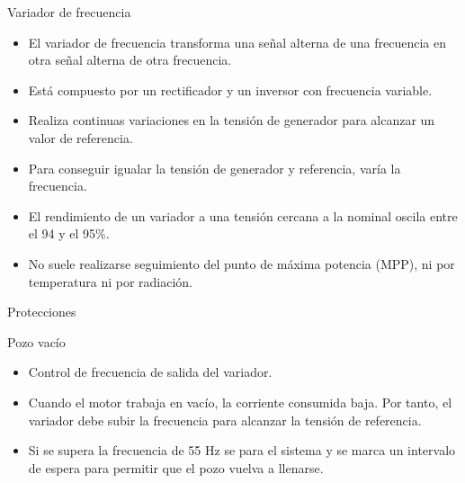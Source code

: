 \documentclass[xcolor={usenames,svgnames,dvipsnames}]{beamer}
\begin{document}
\begin{frame}[label=sec-3-0-3]{Variador de frecuencia}
\begin{itemize}
\item El variador de frecuencia \alert{transforma una señal alterna de una frecuencia en otra señal alterna de otra frecuencia}.

\item Está compuesto por un rectificador y un inversor con frecuencia variable.

\item Realiza \alert{continuas variaciones en la tensión de generador para alcanzar un valor de referencia}.

\item Para conseguir igualar la tensión de generador y referencia, varía la frecuencia.

\item El rendimiento de un variador a una tensión cercana a la nominal oscila entre el 94 y el 95\%.

\item No suele realizarse seguimiento del punto de máxima potencia (MPP), ni por temperatura ni por radiación.
\end{itemize}
\end{frame}

\begin{frame}[label=sec-3-0-4]{Protecciones}
\begin{block}{Pozo vacío}
\begin{itemize}
\item \alert{Control de frecuencia de salida del variador}.

\item Cuando el motor trabaja en vacío, la corriente consumida baja. Por tanto, el variador debe subir la frecuencia para alcanzar la tensión de referencia.

\item Si se supera la frecuencia de 55 Hz se para el sistema y se marca un intervalo de espera para permitir que el pozo vuelva a llenarse.
\end{itemize}
\end{block}
\end{frame}
\end{document}
